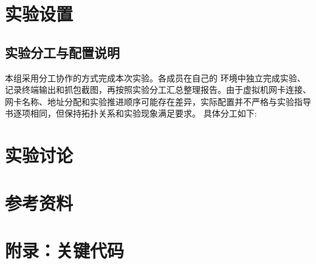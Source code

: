 \documentclass{lab1report}
\begin{document}
\makecover




\section{实验设置}

\subsection{实验分工与配置说明}

本组采用分工协作的方式完成本次实验。各成员在自己的 环境中独立完成实验、记录终端输出和抓包截图，再按照实验分工汇总整理报告。由于虚拟机网卡连接、网卡名称、地址分配和实验推进顺序可能存在差异，实际配置并不严格与实验指导书逐项相同，但保持拓扑关系和实验现象满足要求。
具体分工如下:






\section{实验讨论}


\section{参考资料}
\printbibliography[heading=none]

\newpage
\appendix
\section{附录：关键代码}

\end{document}

